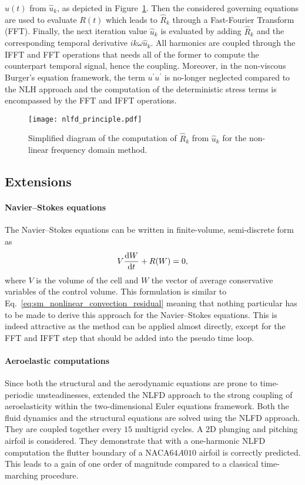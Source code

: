 $u(t)$ from $\widehat{u}_k$, as depicted
in Figure~\ref{fig:nlfd_principle}. Then the considered governing equations
are used to evaluate $R(t)$ which leads to $\widehat{R}_k$
through a Fast-Fourier Transform (FFT). Finally, the next iteration value 
$\widehat{u}_k$
is evaluated by adding $\widehat{R}_k$ and 
the corresponding temporal derivative $i k \omega \widehat{u}_k$. All
harmonics are coupled through the IFFT and FFT operations
that needs all of the former to compute the counterpart temporal signal,
hence the coupling. Moreover, 
in the non-viscous Burger's equation framework, 
the term $u^\prime u^\prime$ is no-longer neglected compared to the
NLH approach and the computation of the deterministic stress terms is encompassed
by the FFT and IFFT operations.
\begin{figure}[htp]
  \centering
  \texttt{[image: nlfd\_principle.pdf]}
  \caption{Simplified diagram of the computation of $\widehat{R}_k$ from $\widehat{u}_k$
  for the non-linear frequency domain method.}
  \label{fig:nlfd_principle}
\end{figure}

\subsection{Extensions}

\paragraph{Navier--Stokes equations}
The Navier--Stokes equations can be written in finite-volume,
semi-discrete form as
\begin{equation}
	V \frac{\diff W}{\diff t} + R(W) = 0,
	\label{eq:navier_stokes_fv_sd}
\end{equation}
where $V$ is the volume of the cell and $W$
the vector of average conservative variables of the
control volume.
This formulation is similar to
Eq.~\eqref{eq:sm_nonlinear_convection_residual} meaning that
nothing particular has to be made to derive this approach for
the Navier--Stokes equations. This is indeed attractive as the
method can be applied almost directly, except for the FFT and IFFT
step that should be added into the pseudo time loop.

\paragraph{Aeroelastic computations}
Since both the structural and the aerodynamic equations
are prone to time-periodic unsteadinesses,
\citet{Kachra2008} extended the NLFD approach to the strong coupling of
aeroelasticity within the two-dimensional Euler equations framework.
Both the fluid dynamics and the structural equations
are solved using the NLFD approach. They are coupled together 
every $15$ multigrid cycles.
A $2$D plunging and pitching airfoil is considered.
They demonstrate that with a one-harmonic NLFD computation the
flutter boundary of a NACA$64A010$ airfoil is correctly predicted.
This leads to a gain of one order of magnitude compared to a classical
time-marching procedure. 

